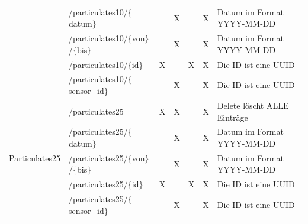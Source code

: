 \begin{landscape}
\begin{table}[H]
\begin{longtable}{lllllll}
                                      & /particulates10/$\{$datum$\}$           &   & X &   & X & Datum im Format YYYY-MM-DD                                              \\
                                      & /particulates10/$\{$von$\}$/$\{$bis$\}$ &   & X &   & X & Datum im Format YYYY-MM-DD                                              \\
                                      & /particulates10/$\{$id$\}$              & X &   & X & X & Die ID ist eine UUID                                                    \\
                                      & /particulates10/$\{$sensor\_id$\}$      &   & X &   & X & Die ID ist eine UUID                                                    \\ \midrule
      \multirow{5}{*}{Particulates25} & /particulates25                         & X & X &   & X & Delete löscht ALLE Einträge                                             \\
                                      & /particulates25/$\{$datum$\}$           &   & X &   & X & Datum im Format YYYY-MM-DD                                              \\
                                      & /particulates25/$\{$von$\}$/$\{$bis$\}$ &   & X &   & X & Datum im Format YYYY-MM-DD                                              \\
                                      & /particulates25/$\{$id$\}$              & X &   & X & X & Die ID ist eine UUID                                                    \\
                                      & /particulates25/$\{$sensor\_id$\}$      &   & X &   & X & Die ID ist eine UUID                                                    \\ \midrule
    \end{longtable}
  \end{table}

  \newpage


\end{landscape}
